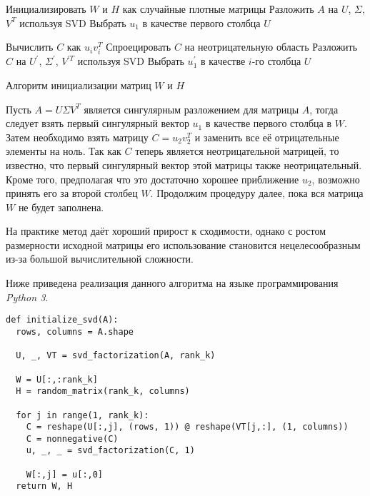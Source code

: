 \begin{algorithm}

  \BlankLine
  \BlankLine


  \BlankLine

  Инициализировать  $W$ и $H$ как случайные плотные матрицы\;
  Разложить $A$ на $U$, $\Sigma$, $V^T$ используя SVD\;
  Выбрать $u_1$ в качестве первого столбца $U$\;

   {
    Вычислить $C$ как $u_i v_i^T$\;
    Спроецировать $C$ на неотрицательную область\;
    Разложить $C$ на $U^\prime$, $\Sigma^\prime$, $V^{\prime T}$ используя SVD\;
    Выбрать $u^\prime_1$ в качестве $i$-го столбца $U$\;
  }

  \BlankLine

  \caption{Алгоритм инициализации матриц $W$ и $H$}
\end{algorithm}

Пусть $A = U \Sigma V^T $ является сингулярным разложением \cite{demmel} для матрицы $A$,
тогда следует взять первый сингулярный вектор $u_1$ в качестве первого столбца в $W$.
Затем необходимо взять матрицу $C = u_2 v_2^T$ и заменить все её отрицательные элементы на ноль.
Так как $C$ теперь является неотрицательной матрицей, то известно, что первый сингулярный вектор этой матрицы также неотрицательный.
Кроме того, предполагая что это достаточно хорошее приближение $u_2$, возможно принять его за второй столбец $W$.
Продолжим процедуру далее, пока вся матрица $W$ не будет заполнена.

На практике метод даёт хороший прирост к сходимости,
однако с ростом размерности исходной матрицы его использование становится
нецелесообразным из-за большой вычислительной сложности.


\newpage

Ниже приведена реализация данного алгоритма на языке программирования \textit{Python 3}.
\\

\begin{lstlisting}[caption=Алгоритм SVD инициализации]
def initialize_svd(A):
  rows, columns = A.shape

  U, _, VT = svd_factorization(A, rank_k)

  W = U[:,:rank_k]
  H = random_matrix(rank_k, columns)

  for j in range(1, rank_k):
    C = reshape(U[:,j], (rows, 1)) @ reshape(VT[j,:], (1, columns))
    C = nonnegative(C)
    u, _, _ = svd_factorization(C, 1)

    W[:,j] = u[:,0]
  return W, H
\end{lstlisting}




